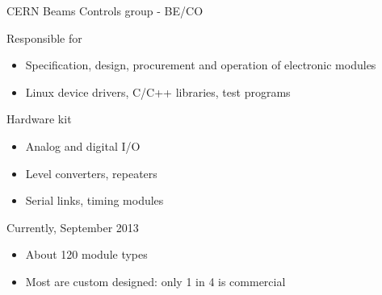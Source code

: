 \documentclass[compress,red]{beamer}
\begin{document}
\begin{frame}{CERN Beams Controls group - BE/CO}

  \begin{block}{Responsible for}
    \begin{itemize}
    \item Specification, design, procurement and operation of electronic modules
    \item Linux device drivers, C/C++ libraries, test programs
    \end{itemize}
  \end{block}

  \begin{block}{Hardware kit}
    \begin{itemize}
    \item Analog and digital I/O
    \item Level converters, repeaters
    \item Serial links, timing modules
    \end{itemize}
  \end{block}

  \begin{block}{Currently, September 2013}
    \begin{itemize}
    \item About 120 module types %
    \item Most are custom designed: only 1 in 4 is commercial
    \end{itemize}
  \end{block}



\end{frame}
\end{document}
